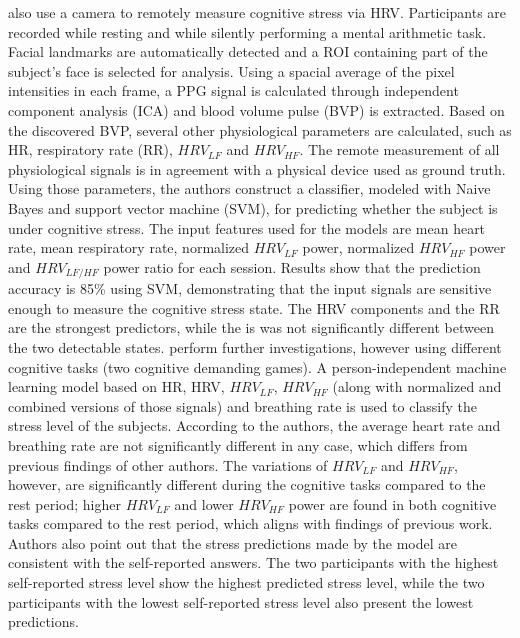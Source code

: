 \textcite{mcduff2014remote} also use a camera to remotely measure cognitive stress via HRV. Participants are recorded while resting and while silently performing a mental arithmetic task. Facial landmarks are automatically detected and a ROI containing part of the subject's face is selected for analysis. Using a spacial average of the pixel intensities in each frame, a PPG signal is calculated through independent component analysis (ICA) and blood volume pulse (BVP) is extracted. Based on the discovered BVP, several other physiological parameters are calculated, such as HR, respiratory rate (RR), $HRV_{LF}$ and $HRV_{HF}$. The remote measurement of all physiological signals is in agreement with a physical device used as ground truth. Using those parameters, the authors construct a classifier, modeled with Naive Bayes and support vector machine (SVM), for predicting whether the subject is under cognitive stress. The input features used for the models are mean heart rate, mean respiratory rate, normalized $HRV_{LF}$ power, normalized $HRV_{HF}$ power and $HRV_{LF/HF}$ power ratio for each session. Results show that the prediction accuracy is 85\% using SVM, demonstrating that the input signals are sensitive enough to measure the cognitive stress state. The HRV components and the RR are the strongest predictors, while the is was not significantly different between the two detectable states. \textcite{mcduffcogcam} perform further investigations, however using different cognitive tasks (two cognitive demanding games). A person-independent machine learning model based on HR, HRV, $HRV_{LF}$, $HRV_{HF}$ (along with normalized and combined versions of those signals) and breathing rate is used to classify the stress level of the subjects. According to the authors, the average heart rate and breathing rate are not significantly different in any case, which differs from previous findings of other authors. The variations of $HRV_{LF}$ and $HRV_{HF}$, however, are significantly different during the cognitive tasks compared to the rest period; higher $HRV_{LF}$ and lower $HRV_{HF}$ power are found in both cognitive tasks compared to the rest period, which aligns with findings of previous work. Authors also point out that the stress predictions made by the model are consistent with the self-reported answers. The two participants with the highest self-reported stress level show the highest predicted stress level, while the two participants with the lowest self-reported stress level also present the lowest predictions. %

